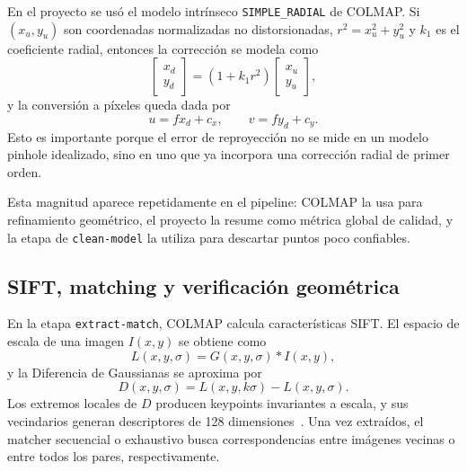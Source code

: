 \documentclass[conference]{IEEEtran}
\begin{document}
En el proyecto se us\'o el modelo intr\'inseco \texttt{SIMPLE\_RADIAL} de COLMAP. Si \((x_u,y_u)\) son coordenadas normalizadas no distorsionadas, \(r^2 = x_u^2 + y_u^2\) y \(k_1\) es el coeficiente radial, entonces la correcci\'on se modela como
\begin{equation}
\begin{bmatrix}
x_d \\ y_d
\end{bmatrix}
=
\left(1 + k_1 r^2\right)
\begin{bmatrix}
x_u \\ y_u
\end{bmatrix},
\end{equation}
y la conversi\'on a p\'ixeles queda dada por
\begin{equation}
u = f x_d + c_x,\qquad v = f y_d + c_y.
\end{equation}
Esto es importante porque el error de reproyecci\'on no se mide en un modelo pinhole idealizado, sino en uno que ya incorpora una correcci\'on radial de primer orden.

Esta magnitud aparece repetidamente en el pipeline: COLMAP la usa para refinamiento geom\'etrico, el proyecto la resume como m\'etrica global de calidad, y la etapa de \texttt{clean-model} la utiliza para descartar puntos poco confiables.

\subsection{SIFT, matching y verificaci\'on geom\'etrica}

En la etapa \texttt{extract-match}, COLMAP calcula caracter\'isticas SIFT. El espacio de escala de una imagen \(I(x,y)\) se obtiene como
\begin{equation}
L(x,y,\sigma) = G(x,y,\sigma) * I(x,y),
\end{equation}
y la Diferencia de Gaussianas se aproxima por
\begin{equation}
D(x,y,\sigma) = L(x,y,k\sigma) - L(x,y,\sigma).
\end{equation}
Los extremos locales de \(D\) producen keypoints invariantes a escala, y sus vecindarios generan descriptores de 128 dimensiones~\cite{b4}. Una vez extra\'idos, el matcher secuencial o exhaustivo busca correspondencias entre im\'agenes vecinas o entre todos los pares, respectivamente.
\end{document}
